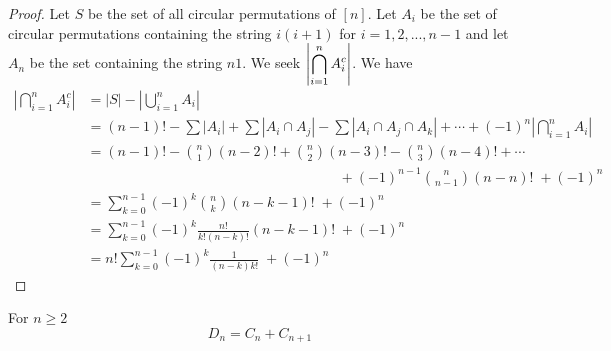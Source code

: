 \documentclass[handout]{ximera}
\begin{document}
\begin{proof}
Let $S$ be the set of all circular permutations of $[n]$. Let $A_i$ be the set of circular permutations 
containing the string $i(i+1)$ for $i = 1, 2, ..., n-1$
and let $A_n$ be the set containing the string $n1$. We seek $\displaystyle \left|\bigcap_{i=1}^n A_i^c\right|$. We have
\begin{align*}
\left|\bigcap_{i=1}^n A_i^c\right| &= |S| - \left|\bigcup_{i=1}^n A_i\right|\\
&= (n-1)! - \sum |A_i| + \sum |A_i \cap A_j| - \sum |A_i \cap A_j \cap A_k| 
    + \cdots + (-1)^n \left|\bigcap_{i=1}^n A_i\right|\\
&= (n-1)! - \binom{n}{1} (n-2)! + \binom{n}{2} (n-3)! - \binom{n}{3} (n-4)! + \cdots \\
 & \qquad \qquad\qquad\qquad\qquad\qquad\qquad\qquad\qquad+ (-1)^{n-1} \binom{n}{n-1} (n-n)! \;+ (-1)^n\\
&= \sum_{k=0}^{n-1} (-1)^k \binom{n}{k} (n-k-1)! \;+ (-1)^n\\
&= \sum_{k=0}^{n-1} (-1)^k \frac{n!}{k!(n-k)!} (n-k-1)! \;+ (-1)^n\\
&= n! \sum_{k=0}^{n-1} (-1)^k \frac{1}{(n-k) k!} \;+ (-1)^n
\end{align*}
\end{proof}


\begin{proposition}
For $n \geq 2$
\[
D_n = C_n + C_{n+1}
\]
\end{proposition}
\end{document}
